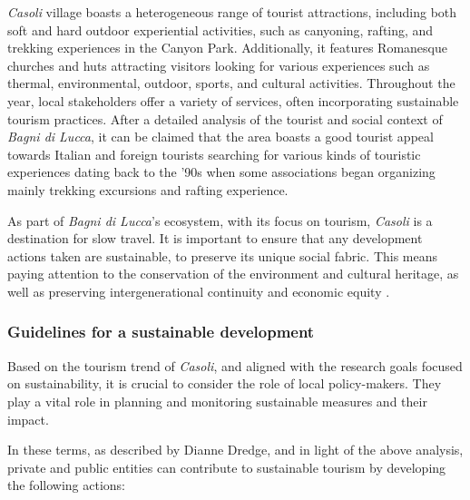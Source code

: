 \documentclass[sustainability,article,submit,pdftex,moreauthors]{Definitions/mdpi}
\begin{document}
\emph{Casoli} village boasts a heterogeneous range of tourist attractions, including both soft and hard outdoor experiential activities, such as canyoning, rafting, and trekking experiences in the Canyon Park. Additionally, it features Romanesque churches and huts attracting visitors looking for various experiences such as thermal, environmental, outdoor, sports, and cultural activities. Throughout the year, local stakeholders offer a variety of services, often incorporating sustainable tourism practices. After a detailed analysis of the tourist and social context of \emph{Bagni di Lucca}, it can be claimed that the area boasts a good tourist appeal towards Italian and foreign tourists searching for various kinds of touristic experiences \cite{loz09} dating back to the '90s when some associations began organizing mainly trekking excursions and rafting experience.

As part of \emph{Bagni di Lucca}'s ecosystem, with its focus on tourism, \emph{Casoli} is a destination for slow travel. It is important to ensure that any development actions taken are sustainable, to preserve its unique social fabric. This means paying attention to the conservation of the environment and cultural heritage, as well as preserving intergenerational continuity and economic equity \cite{kuh10a}.

\subsubsection{Guidelines for a sustainable development}

Based on the tourism trend of \emph{Casoli}, and aligned with the research goals focused on sustainability, it is crucial to consider the role of local policy-makers. They play a vital role in planning and monitoring sustainable measures and their impact.

In these terms, as described by \cite{dre22} Dianne Dredge, and in light of the above analysis, private and public entities can contribute to sustainable tourism by developing the following actions: 
\end{document}
